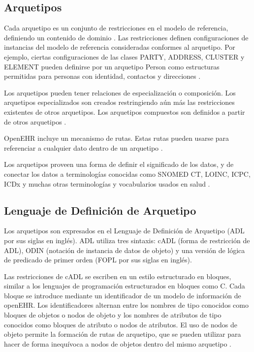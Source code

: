 \subsection{Arquetipos}

Cada arquetipo es un conjunto de restricciones en el modelo de referencia, definiendo un contenido de dominio \cite{openEHRArchitecture}. Las restricciones definen configuraciones de instancias del modelo de referencia consideradas conformes al arquetipo. Por ejemplo, ciertas configuraciones de las clases PARTY, ADDRESS, CLUSTER y ELEMENT pueden definirse por un arquetipo Person como estructuras permitidas para personas con identidad, contactos y direcciones \cite{openEHRAOM}.

Los arquetipos pueden tener relaciones de especialización o composición. Los arquetipos especializados son creados restringiendo aún más las restricciones existentes de otros arquetipos. Los arquetipos compuestos son definidos a partir de otros arquetipos \cite{openEHRArchitecture}.

OpenEHR incluye un mecanismo de rutas. Estas rutas pueden usarse para referenciar a cualquier dato dentro de un arquetipo \cite{openEHRArchitecture}.

Los arquetipos proveen una forma de definir el significado de los datos, y de conectar los datos a terminologías conocidas como SNOMED CT, LOINC, ICPC, ICDx y muchas otras terminologías y vocabularios usados en salud \cite{openEHRArchitecture}.

\subsection{Lenguaje de Definición de Arquetipo}

Los arquetipos son expresados en el Lenguaje de Definición de Arquetipo \cite{openEHRADL} (ADL por sus siglas en inglés). ADL utiliza tres sintaxis: cADL (forma de restricción de ADL), ODIN (notación de instancia de datos de objeto) y una versión de lógica de predicado de primer orden (FOPL por sus siglas en inglés).

Las restricciones de cADL se escriben en un estilo estructurado en bloques, similar a los lenguajes de programación estructurados en bloques como C. Cada bloque se introduce mediante un identificador de un modelo de información de openEHR. Los identificadores alternan entre los nombres de tipo conocidos como bloques de objetos o nodos de objeto y los nombres de atributos de tipo conocidos como bloques de atributo o nodos de atributos. El uso de nodos de objeto permite la formación de rutas de arquetipo, que se pueden utilizar para hacer de forma inequívoca a nodos de objetos dentro del mismo arquetipo \cite{openEHRADL}.

